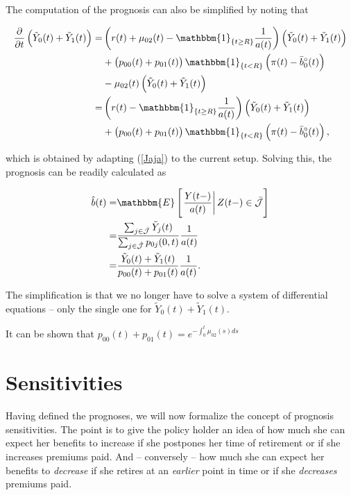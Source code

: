 \documentclass{book}
\newcommand{\1}[1]{\mathbbm{1}_{\left\lbrace #1 \right\rbrace}}
\newcommand{\econd}[2][def]{\mathbbm{E} \left[ \left. #1 \right| #2 \right]}
\theoremstyle{break}
\theoremstyle{remark}
\newenvironment{remark}
  {\pushQED{\qed}\renewcommand{\qedsymbol}{\scalebox{1.4}{$\circ$}}\remarkx}
  {\popQED\endremarkx}
\numberwithin{equation}{section}
\begin{document}
The computation of the prognosis can also be simplified by noting that

\begin{align*}
	\frac{\partial}{\partial t} \left(\tilde{Y}_0(t) + \tilde{Y}_1(t)\right) =& \left( r(t) + \mu_{02}(t) - \1{t \geq R} \frac{1}{a(t)}\right) \left(\tilde{Y}_0(t) + \tilde{Y}_1(t)\right) \\
	&+ \left(p_{00}(t) + p_{01}(t)\right)\1{t<R}\left(\pi(t) - \bar{b}_0^\circ(t)\right) \\
	&- \mu_{02}(t) \left(\tilde{Y}_0(t) + \tilde{Y}_1(t)\right) \\
	=& \left( r(t) - \1{t \geq R} \frac{1}{a(t)}\right) \left(\tilde{Y}_0(t) + \tilde{Y}_1(t)\right) \\
	&+ \left(p_{00}(t) + p_{01}(t)\right)\1{t<R}\left(\pi(t) - \bar{b}_0^\circ(t)\right),
\end{align*}

which is obtained by adapting (\ref{Jaja}) to the current setup. Solving this, the prognosis can be readily calculated as

\begin{align*}
	\hat{b}(t) =& \econd[\frac{Y(t-)}{a(t)}]{Z(t-) \in \bar{\mathcal{J}}} \\
	=&\frac{\sum_{j \in \hat{\mathcal{J}}} \tilde{Y}_j(t)}{\sum_{j \in \hat{\mathcal{J}}} p_{0j}(0,t)} \frac{1}{a(t)} \\
	=&\frac{\tilde{Y}_0(t) + \tilde{Y}_1(t)}{p_{00}(t) + p_{01}(t)} \frac{1}{a(t)}.
\end{align*}

The simplification is that we no longer have to solve a system of differential equations -- only the single one for $\tilde{Y}_0(t) + \tilde{Y}_1(t)$.

\begin{remark}
	It can be shown that $p_{00}(t) + p_{01}(t) = e^{-\int_0^t \mu_{02}(s)ds}$
\end{remark}

\chapter{Sensitivities}

Having defined the prognoses, we will now formalize the concept of prognosis sensitivities. The point is to give the policy holder an idea of how much she can expect her benefits to increase if she postpones her time of retirement or if she increases premiums paid. And -- conversely -- how much she can expect her benefits to \textit{decrease} if she retires at an \textit{earlier} point in time or if she \textit{decreases} premiums paid.
\end{document}
